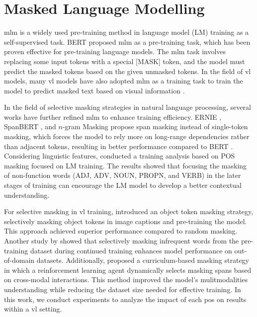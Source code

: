 \section{Masked Language Modelling}
\acrshort{mlm} is a widely used pre-training method in language model (LM) training \cite{bert, albert, dictbert, opt, realm} as a self-supervised task. 
BERT \cite{bert} proposed \acrshort{mlm} as a pre-training task, which has been proven effective for pre-training language models. 
The \acrshort{mlm} task involves replacing some input tokens with a special [MASK] token, and the model must predict the masked tokens based on the given unmasked tokens. 
In the field of \acrshort{vl} models, many \acrshort{vl} models have also adopted \acrshort{mlm} as a training task to train the model to predict masked text based on visual information \cite{albef, mplug, uniter, beit-3}.

In the field of selective masking strategies in natural language processing, several works have further refined \acrshort{mlm} to enhance training efficiency. 
ERNIE \cite{ERNIE}, SpanBERT \cite{spanBERT}, and \(n\)-gram Masking \cite{n-gram-masking} propose span masking instead of single-token masking, which forces the model to rely more on long-range dependencies rather than adjacent tokens, resulting in better performance compared to BERT \cite{bert}. 
Considering linguistic features,  conducted a training analysis based on POS masking focused on LM training. 
The results showed that focusing the masking of non-function words (ADJ, ADV, NOUN, PROPN, and VERB) in the later stages of training can encourage the LM model to develop a better contextual understanding.

For selective masking in \acrshort{vl} training,  introduced an object token masking strategy, selectively masking object tokens in image captions and pre-training the model. 
This approach achieved superior performance compared to random masking. 
Another study by  showed that selectively masking infrequent words from the pre-training dataset during continued training enhances model performance on out-of-domain datasets. 
Additionally, \cite{rf-curriculum-masking} proposed a curriculum-based masking strategy in which a reinforcement learning agent dynamically selects masking spans based on cross-modal interactions. 
This method improved the model’s mulitmodalities understanding while reducing the dataset size needed for effective training. 
In this work, we conduct experiments to analyze the impact of each \acrshort{pos} on results within a \acrshort{vl} setting.

